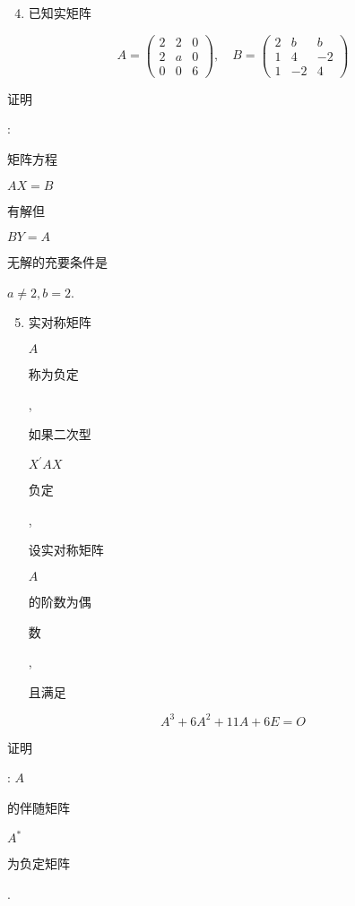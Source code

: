 \documentclass[10pt]{article}
\begin{document}
\begin{enumerate}
  \setcounter{enumi}{3}
  \item \begin{CJK}{UTF8}{mj}已知实矩阵\end{CJK}
\end{enumerate}
$$
A=\left(\begin{array}{lll}
2 & 2 & 0 \\
2 & a & 0 \\
0 & 0 & 6
\end{array}\right), \quad B=\left(\begin{array}{ccc}
2 & b & b \\
1 & 4 & -2 \\
1 & -2 & 4
\end{array}\right)
$$
\begin{CJK}{UTF8}{mj}证明\end{CJK}: \begin{CJK}{UTF8}{mj}矩阵方程\end{CJK} $A X=B$ \begin{CJK}{UTF8}{mj}有解但\end{CJK} $B Y=A$ \begin{CJK}{UTF8}{mj}无解的充要条件是\end{CJK} $a \neq 2, b=2$.

\begin{enumerate}
  \setcounter{enumi}{4}
  \item \begin{CJK}{UTF8}{mj}实对称矩阵\end{CJK} $A$ \begin{CJK}{UTF8}{mj}称为负定\end{CJK}, \begin{CJK}{UTF8}{mj}如果二次型\end{CJK} $X^{\prime} A X$ \begin{CJK}{UTF8}{mj}负定\end{CJK}, \begin{CJK}{UTF8}{mj}设实对称矩阵\end{CJK} $A$ \begin{CJK}{UTF8}{mj}的阶数为偶\end{CJK} \begin{CJK}{UTF8}{mj}数\end{CJK}, \begin{CJK}{UTF8}{mj}且满足\end{CJK}
\end{enumerate}
$$
A^{3}+6 A^{2}+11 A+6 E=O
$$
\begin{CJK}{UTF8}{mj}证明\end{CJK}: $A$ \begin{CJK}{UTF8}{mj}的伴随矩阵\end{CJK} $A^{*}$ \begin{CJK}{UTF8}{mj}为负定矩阵\end{CJK}.
\end{document}
